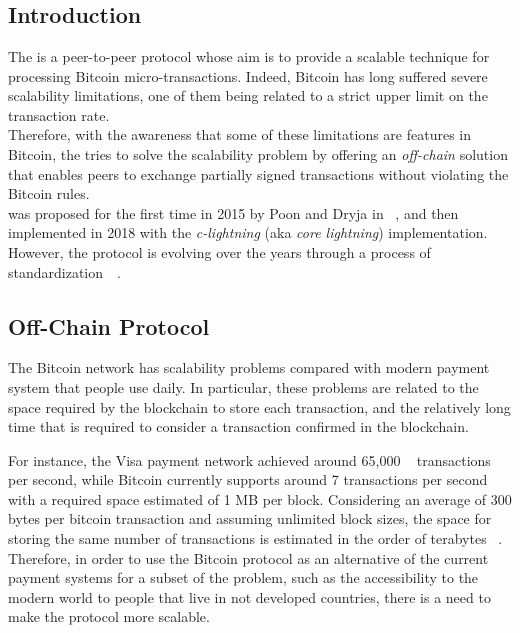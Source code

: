 \chapter{{\LN}}\label{sec:lightning_network}

\section{Introduction}

The \emph{{\LN}} is a peer-to-peer protocol whose aim is to provide a scalable technique for processing Bitcoin micro-transactions. Indeed, Bitcoin has long suffered severe scalability limitations, one of them being related to a strict upper limit on the transaction rate.\\
Therefore, with the awareness that some of these limitations are features in Bitcoin, the {\LN} tries to solve
the scalability problem by offering an \emph{off-chain} solution that enables peers to exchange partially
signed transactions without violating the Bitcoin rules.\\
{\LN} was proposed for the first time in 2015 by Poon and Dryja in  ~\cite{lightning-network-paper},
and then implemented in 2018 with the \emph{c-lightning} (aka \emph{core lightning}) implementation.
However, the protocol is evolving over the years through a process of standardization~~\cite{lightning-bolts}.

\section{Off-Chain Protocol}

The Bitcoin network has scalability problems compared with modern payment system that people use daily.
In particular, these problems are related to the space required by the blockchain to store each transaction,
and the relatively long time that is required to consider a transaction confirmed in the blockchain.

For instance, the Visa payment network  achieved around 65,000 ~\cite{visa-sheet} transactions per second, while
Bitcoin currently supports around 7 transactions per second with a required space estimated of 1 MB per block. Considering
an average of 300 bytes per bitcoin transaction and assuming unlimited block sizes, the space for storing the same number
of transactions is estimated in the order of terabytes ~\cite{lightning-network-paper}. Therefore, in order to use the Bitcoin
protocol as an alternative of the current payment systems for a subset of the problem, such as the accessibility to the modern world
to people that live in not developed countries, there is a need to make the protocol more scalable.

